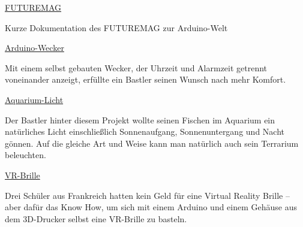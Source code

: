 \begin{links}
	\item \href{https://www.youtube.com/watch?v=EbVmfGNwn0g}{FUTUREMAG}
	
	Kurze Dokumentation des FUTUREMAG zur Arduino-Welt
	
	\item \href{https://www.heise.de/make/meldung/Mehr-Komfort-der-Arduino-Ueberkopfwecker-4046184.html}{Arduino-Wecker}
	
	Mit einem selbst gebauten Wecker, der Uhrzeit und Alarmzeit getrennt voneinander anzeigt, erfüllte ein Bastler seinen Wunsch nach mehr Komfort.
	
	\item \href{https://www.instructables.com/id/Aquarium-LED-Controller/}{Aquarium-Licht}
	
	Der Bastler hinter diesem Projekt wollte seinen Fischen im Aquarium ein natürliches Licht einschließlich Sonnenaufgang, Sonnenuntergang und Nacht gönnen. Auf die gleiche Art und Weise kann man natürlich auch sein Terrarium beleuchten.
	
	\item \href{https://www.heise.de/make/meldung/Kein-Geld-fuer-eine-Oculus-Rift-VR-Brille-selbstgebaut-3949507.html}{VR-Brille}
	
	Drei Schüler aus Frankreich hatten kein Geld für eine Virtual Reality Brille – aber dafür das Know How, um sich mit einem Arduino und einem Gehäuse aus dem 3D-Drucker selbst eine VR-Brille zu basteln.
\end{links}